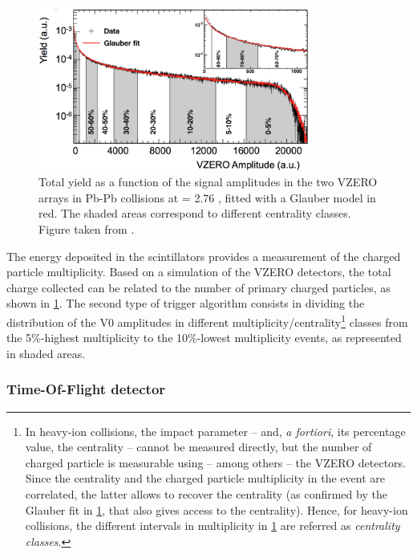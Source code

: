 \begin{figure}[h]
	\centering
	\includegraphics[width=0.8\textwidth]{Figs/Chapter3/Fig8-4236.png}
	\caption{Total yield as a function of the signal amplitudes in the two VZERO arrays in Pb-Pb collisions at \sqrtSnn = 2.76 \tev, fitted with a Glauber model in red. The shaded areas correspond to different centrality classes. Figure taken from \cite{alicecollaborationPerformanceALICEVZERO2013}.}
	\label{fig:VZEROcentrality}
\end{figure}

The energy deposited in the scintillators provides a measurement of the charged particle multiplicity. Based on a simulation of the VZERO detectors, the total charge collected can be related to the number of primary charged particles, as shown in \fig\ref{fig:VZEROcentrality}. The second type of trigger algorithm consists in dividing the distribution of the V0 amplitudes in different multiplicity/centrality\footnote{In heavy-ion collisions, the impact parameter -- and, \textit{a fortiori}, its percentage value, the centrality -- cannot be measured directly, but the number of charged particle is measurable using -- among others -- the VZERO detectors. Since the centrality and the charged particle multiplicity in the event are correlated, the latter allows to recover the centrality (as confirmed by the Glauber fit in \fig\ref{fig:VZEROcentrality}, that also gives access to the centrality). Hence, for heavy-ion collisions, the different intervals in multiplicity in \fig\ref{fig:VZEROcentrality} are referred as \textit{centrality classes}.} classes from the 5\%-highest multiplicity to the 10\%-lowest multiplicity events, as represented in shaded areas. 

\subsubsection{Time-Of-Flight detector}
\label{subsubsec:TOF}

